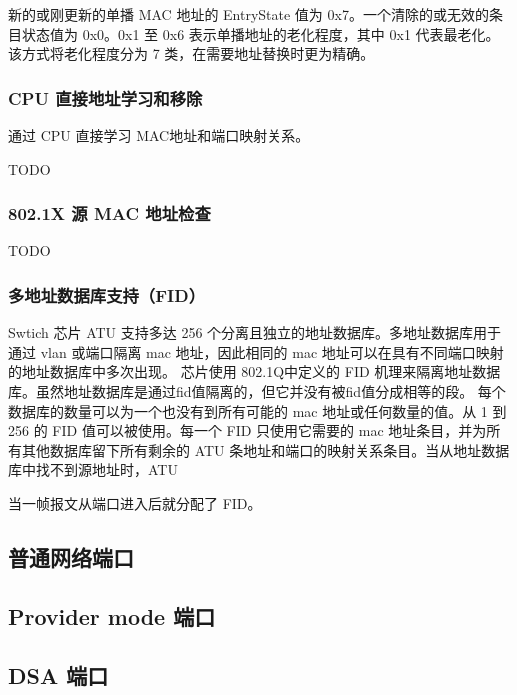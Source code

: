 新的或刚更新的单播 MAC 地址的 EntryState 值为 0x7。一个清除的或无效的条目状态值为 0x0。0x1 至 0x6 表示单播地址的老化程度，其中 0x1 代表最老化。
该方式将老化程度分为 7 类，在需要地址替换时更为精确。

\subsubsection{CPU 直接地址学习和移除}
通过 CPU 直接学习 MAC地址和端口映射关系。

TODO

\subsubsection{802.1X 源 MAC 地址检查}
TODO

\subsubsection{多地址数据库支持（FID）}
Swtich 芯片 ATU 支持多达 256 个分离且独立的地址数据库。多地址数据库用于通过 vlan 或端口隔离 mac 地址，因此相同的 mac 地址可以在具有不同端口映射的地址数据库中多次出现。
芯片使用 802.1Q中定义的 FID 机理来隔离地址数据库。虽然地址数据库是通过fid值隔离的，但它并没有被fid值分成相等的段。
每个数据库的数量可以为一个也没有到所有可能的 mac 地址或任何数量的值。从 1 到 256 的 FID 值可以被使用。每一个 FID 只使用它需要的 mac 地址条目，并为所有其他数据库留下所有剩余的 ATU 条地址和端口的映射关系条目。当从地址数据库中找不到源地址时，ATU 

当一帧报文从端口进入后就分配了 FID。
\subsection{普通网络端口}

\subsection{Provider mode 端口}

\subsection{DSA 端口}